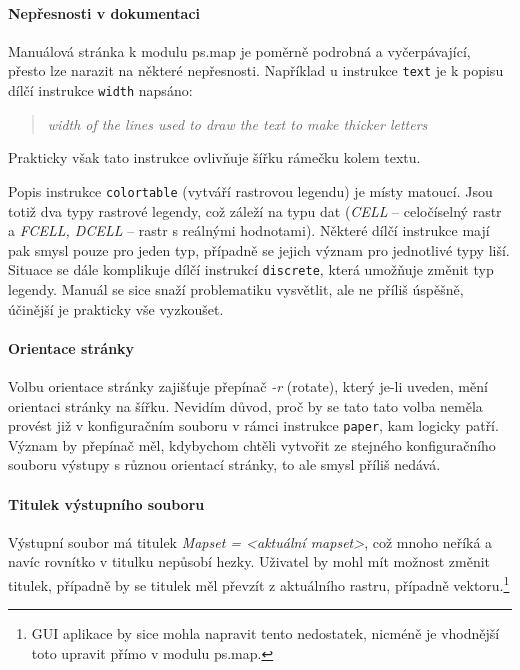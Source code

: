 \documentclass[a4paper,12pt,draft]{article}
\newcommand{\instr}[1]{\lstinline[style=psmapInline]|#1|}
\begin{document}
{\paragraph*{Nepřesnosti v dokumentaci}
\label{sec:psmap:manual}
Manuálová stránka \cite{manual} k modulu ps.map je poměrně
podrobná a vyčerpávající, přesto lze narazit na některé
nepřesnosti. Například u instrukce \instr{text} je k popisu dílčí
instrukce \instr{width} napsáno:
 \begin{quotation}\it
width of the lines used to draw the text to make thicker letters
\end{quotation}
Prakticky však tato instrukce ovlivňuje šířku rámečku kolem textu.

Popis instrukce \instr{colortable} (vytváří rastrovou legendu) je místy
matoucí. Jsou totiž dva typy rastrové legendy, což záleží na typu dat
(\emph{CELL} -- celočíselný rastr a \emph{FCELL, DCELL} -- 
rastr s reálnými hodnotami). Některé dílčí instrukce mají pak smysl pouze pro
jeden typ,
případně se jejich význam pro jednotlivé typy liší. Situace se dále
komplikuje dílčí instrukcí \instr{discrete}, která umožňuje změnit
typ legendy. Manuál se sice snaží problematiku vysvětlit, ale ne příliš
úspěšně, účinější je prakticky vše vyzkoušet.

\paragraph*{Orientace stránky}
Volbu orientace stránky zajišťuje přepínač \emph{-r} (rotate), který
je-li uveden, mění orientaci stránky na šířku. Nevidím důvod, proč by
se tato tato volba neměla provést již v konfiguračním souboru v rámci
instrukce \instr{paper}, kam logicky patří. Význam by přepínač měl,
kdybychom chtěli vytvořit ze stejného konfiguračního souboru výstupy
s různou orientací stránky, to ale smysl příliš nedává.

\paragraph*{Titulek výstupního souboru}
Výstupní soubor má titulek \emph{Mapset = \textless aktuální
mapset\textgreater}, což mnoho neříká a navíc rovnítko v titulku
nepůsobí hezky. Uživatel by mohl mít možnost změnit titulek,
případně by se titulek měl převzít z aktuálního rastru, případně
vektoru.\footnote{GUI aplikace by sice mohla napravit tento nedostatek,
nicméně je vhodnější toto upravit přímo v modulu ps.map.}



}
\end{document}
